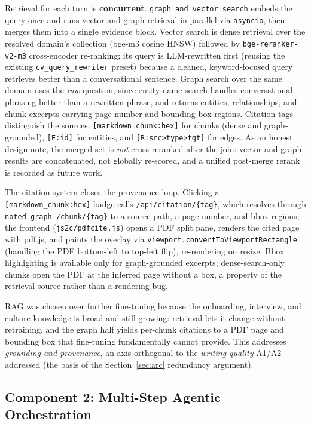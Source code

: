 Retrieval for each turn is \textbf{concurrent}. \verb|graph_and_vector_search| embeds the
query once and runs vector and graph retrieval in parallel via \verb|asyncio|, then merges
them into a single evidence block. Vector search is dense retrieval over the resolved
domain's collection (bge-m3 cosine HNSW) followed by \verb|bge-reranker-v2-m3|
cross-encoder re-ranking; its query is LLM-rewritten first (reusing the existing
\verb|cv_query_rewriter| preset) because a cleaned, keyword-focused query retrieves better
than a conversational sentence. Graph search over the same domain uses the \emph{raw}
question, since entity-name search handles conversational phrasing better than a rewritten
phrase, and returns entities, relationships, and chunk excerpts carrying page number and
bounding-box regions. Citation tags distinguish the sources: \verb|[markdown_chunk:hex]|
for chunks (dense and graph-grounded), \verb|[E:id]| for entities, and
\verb|[R:src>type>tgt]| for edges. As an honest design note, the merged set is \emph{not}
cross-reranked after the join: vector and graph results are concatenated, not globally
re-scored, and a unified post-merge rerank is recorded as future work.

The citation system closes the provenance loop. Clicking a \verb|[markdown_chunk:hex]|
badge calls \verb|/api/citation/{tag}|, which resolves through
\verb|noted-graph /chunk/{tag}| to a source path, a page number, and bbox regions; the
frontend
(\verb|js2c/pdfcite.js|) opens a PDF split pane, renders the cited page with pdf.js, and
paints the overlay via \verb|viewport.convertToViewportRectangle| (handling the PDF
bottom-left to top-left flip), re-rendering on resize. Bbox highlighting is available only
for graph-grounded excerpts; dense-search-only chunks open the PDF at the inferred page
without a box, a property of the retrieval source rather than a rendering bug.

RAG was chosen over further fine-tuning because the onboarding, interview, and culture
knowledge is broad and still growing: retrieval lets it change without retraining, and the
graph half yields per-chunk citations to a PDF page and bounding box that fine-tuning
fundamentally cannot provide. This addresses \emph{grounding and provenance}, an axis
orthogonal to the \emph{writing quality} A1/A2 addressed (the basis of the
Section~\ref{sec:arc} redundancy argument).

\subsection{Component 2: Multi-Step Agentic Orchestration}
\label{sec:agentic}


